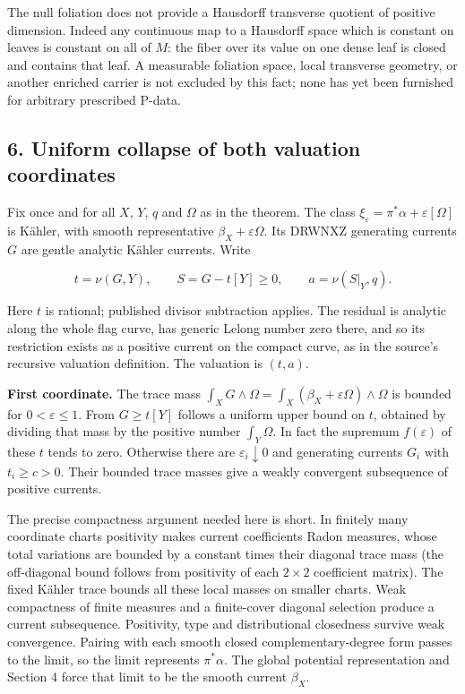 \documentclass[11pt]{article}
\begin{document}
The null foliation does not provide a Hausdorff transverse quotient of positive dimension. Indeed any continuous map to a Hausdorff space which is constant on leaves is constant on all of $M$: the fiber over its value on one dense leaf is closed and contains that leaf. A measurable foliation space, local transverse geometry, or another enriched carrier is not excluded by this fact; none has yet been furnished for arbitrary prescribed P-\allowbreak{}data.

\subsection{6. Uniform collapse of both valuation coordinates}

Fix once and for all $X$, $Y$, $q$ and $\Omega$ as in the theorem. The class $\xi_\varepsilon=\pi^*\alpha+\varepsilon[\Omega]$ is Kähler, with smooth representative $\beta_X+\varepsilon\Omega$. Its DRWNXZ generating currents $G$ are gentle analytic Kähler currents. Write

\[t=\nu(G,Y),\qquad S=G-t[Y]\geq0,\qquad a=\nu(S|_Y,q).\]

Here $t$ is rational; published divisor subtraction applies. The residual is analytic along the whole flag curve, has generic Lelong number zero there, and so its restriction exists as a positive current on the compact curve, as in the source's recursive valuation definition. The valuation is $(t,a)$.

\textbf{First coordinate.} The trace mass $\int_XG\wedge\Omega=\int_X(\beta_X+\varepsilon\Omega)\wedge\Omega$ is bounded for $0<\varepsilon\leq1$. From $G\geq t[Y]$ follows a uniform upper bound on $t$, obtained by dividing that mass by the positive number $\int_Y\Omega$. In fact the supremum $f(\varepsilon)$ of these $t$ tends to zero. Otherwise there are $\varepsilon_i\downarrow0$ and generating currents $G_i$ with $t_i\geq c>0$. Their bounded trace masses give a weakly convergent subsequence of positive currents.

The precise compactness argument needed here is short. In finitely many coordinate charts positivity makes current coefficients Radon measures, whose total variations are bounded by a constant times their diagonal trace mass (the off-\allowbreak{}diagonal bound follows from positivity of each $2\times2$ coefficient matrix). The fixed Kähler trace bounds all these local masses on smaller charts. Weak compactness of finite measures and a finite-\allowbreak{}cover diagonal selection produce a current subsequence. Positivity, type and distributional closedness survive weak convergence. Pairing with each smooth closed complementary-\allowbreak{}degree form passes to the limit, so the limit represents $\pi^*\alpha$. The global potential representation and Section 4 force that limit to be the smooth current $\beta_X$.
\end{document}
